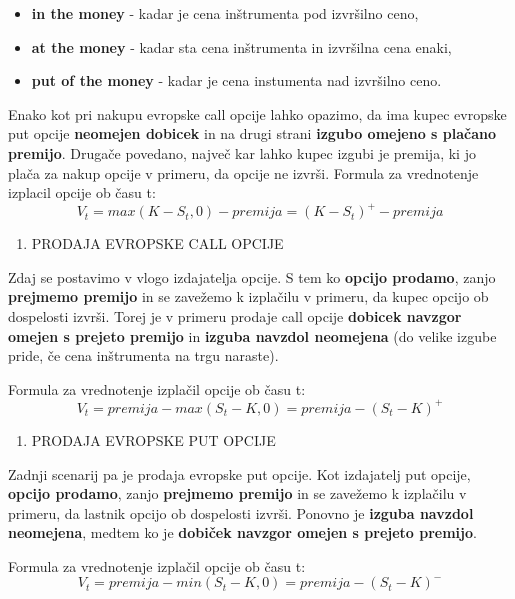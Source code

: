\documentclass[
]{article}
\providecommand{\tightlist}{%
  \setlength{\itemsep}{0pt}\setlength{\parskip}{0pt}}
\begin{document}
\begin{itemize}
\tightlist
\item
  \textbf{in the money} - kadar je cena inštrumenta pod izvršilno ceno,
\item
  \textbf{at the money} - kadar sta cena inštrumenta in izvršilna cena
  enaki,
\item
  \textbf{put of the money} - kadar je cena instumenta nad izvršilno
  ceno.
\end{itemize}

Enako kot pri nakupu evropske call opcije lahko opazimo, da ima kupec
evropske put opcije \textbf{neomejen dobicek} in na drugi strani
\textbf{izgubo omejeno s plačano premijo}. Drugače povedano, največ kar
lahko kupec izgubi je premija, ki jo plača za nakup opcije v primeru, da
opcije ne izvrši. Formula za vrednotenje izplacil opcije ob času t:
\[ V_t = max(K-S_t,0) - premija = (K-S_t)^+ - premija\]

\begin{enumerate}
\def\labelenumi{\arabic{enumi}.}
\setcounter{enumi}{2}
\tightlist
\item
  PRODAJA EVROPSKE CALL OPCIJE
\end{enumerate}

Zdaj se postavimo v vlogo izdajatelja opcije. S tem ko \textbf{opcijo
prodamo}, zanjo \textbf{prejmemo premijo} in se zavežemo k izplačilu v
primeru, da kupec opcijo ob dospelosti izvrši. Torej je v primeru
prodaje call opcije \textbf{dobicek navzgor omejen s prejeto premijo} in
\textbf{izguba navzdol neomejena} (do velike izgube pride, če cena
inštrumenta na trgu naraste).

Formula za vrednotenje izplačil opcije ob času t:
\[ V_t = premija - max(S_t-K,0) = premija - (S_t - K)^+ \]

\begin{enumerate}
\def\labelenumi{\arabic{enumi}.}
\setcounter{enumi}{3}
\tightlist
\item
  PRODAJA EVROPSKE PUT OPCIJE
\end{enumerate}

Zadnji scenarij pa je prodaja evropske put opcije. Kot izdajatelj put
opcije, \textbf{opcijo prodamo}, zanjo \textbf{prejmemo premijo} in se
zavežemo k izplačilu v primeru, da lastnik opcijo ob dospelosti izvrši.
Ponovno je \textbf{izguba navzdol neomejena}, medtem ko je
\textbf{dobiček navzgor omejen s prejeto premijo}.

Formula za vrednotenje izplačil opcije ob času t:
\[ V_t = premija - min(S_t-K,0) = premija - (S_t-K)^-  \]
\end{document}
